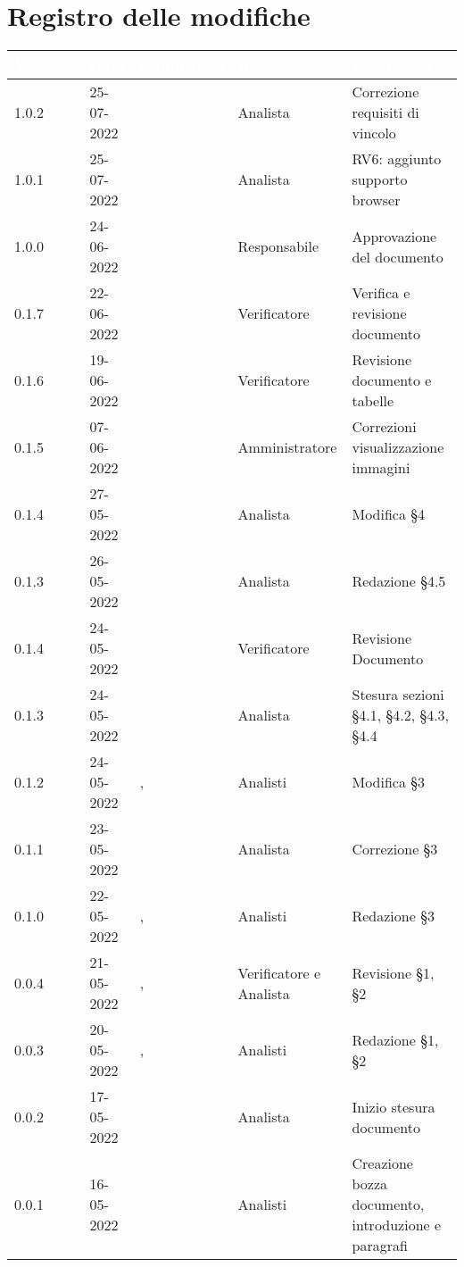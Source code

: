 \section*{Registro delle modifiche}
{

\newlength{\freewidth}
\setlength{\freewidth}{\dimexpr\textwidth-10\tabcolsep}
\renewcommand{\arraystretch}{1.5}
\centering
\setlength{\aboverulesep}{0pt}
\setlength{\belowrulesep}{0pt}
\begin{longtable}{C{.2\freewidth} C{.15\freewidth} C{.26\freewidth} C{.2\freewidth} C{.282379\freewidth}}
	\toprule
{}
\textcolor{white}{\textbf{Versione}}&
\textcolor{white}{\textbf{Data}}&
\textcolor{white}{\textbf{Nominativo}}&
\textcolor{white}{\textbf{Ruolo}}&
\textcolor{white}{\textbf{Descrizione}}\\	
\toprule
\endhead

1.0.2 & 25-07-2022 & \tommaso{} & Analista & Correzione requisiti di vincolo \\
1.0.1 & 25-07-2022 & \marcov{} & Analista & RV6: aggiunto supporto browser \\
1.0.0 & 24-06-2022 & \angela{} & Responsabile & Approvazione del documento \\
0.1.7 & 22-06-2022 & \matteo{} & Verificatore & Verifica e revisione documento\\
0.1.6 & 19-06-2022 & \matteo{} & Verificatore & Revisione documento e tabelle \\
0.1.5 & 07-06-2022 & \marcov{} & Amministratore & Correzioni visualizzazione immagini \\
0.1.4 & 27-05-2022 & \giulio{} & Analista & Modifica \S 4 \\
0.1.3 & 26-05-2022 & \giulio{} & Analista & Redazione \S 4.5 \\
0.1.4 & 24-05-2022 & \matteo{} & Verificatore & Revisione Documento \\
0.1.3 & 24-05-2022 & \marcob{} & Analista & Stesura sezioni \S 4.1, \S 4.2, \S 4.3, \S 4.4 \\
0.1.2 & 24-05-2022 & \giulio{}, \angela{} & Analisti & Modifica \S 3 \\
0.1.1 & 23-05-2022 & \giulio{} & Analista & Correzione \S 3 \\
0.1.0 & 22-05-2022 & \angela{}, \giulio{} & Analisti & Redazione \S 3 \\
0.0.4 & 21-05-2022 & \tommaso{}, \giulio{} & Verificatore e Analista & Revisione \S 1, \S 2 \\
0.0.3 & 20-05-2022 & \marcob{}, \angela{} & Analisti & Redazione \S 1, \S 2 \\		
0.0.2 & 17-05-2022 & \marcov{} & Analista & Inizio stesura documento \\
0.0.1 & 16-05-2022 & \teamname{} & Analisti & Creazione bozza documento, introduzione e paragrafi \\	
\bottomrule
\end{longtable}
}
